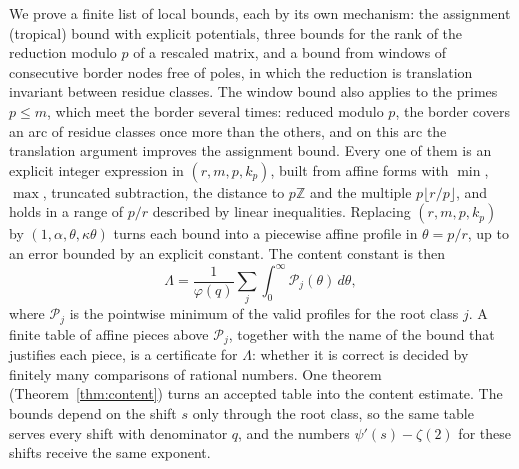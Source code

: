 \documentclass[11pt]{amsart}
\theoremstyle{definition}
\theoremstyle{remark}
\numberwithin{equation}{section}
\newcommand{\Z}{\mathbb Z}
\begin{document}
We prove a finite list of local bounds, each by its own mechanism: the assignment (tropical) bound with explicit
potentials, three bounds for the rank of the reduction modulo $p$ of a rescaled matrix, and a bound from windows of
consecutive border nodes free of poles, in which the reduction is translation invariant between residue classes. The
window bound also applies to the primes $p\le m$, which meet the border several times: reduced modulo $p$, the border
covers an arc of residue classes once more than the others, and on this arc the translation argument improves the
assignment bound.
Every one of them is an explicit integer expression in $(r,m,p,k_p)$, built from affine forms with $\min$, $\max$,
truncated subtraction, the distance to $p\Z$ and the multiple $p\lfloor r/p\rfloor$, and holds in a range of $p/r$
described by linear inequalities.
Replacing $(r,m,p,k_p)$ by $(1,\alpha,\theta,\kappa\theta)$ turns each bound into a piecewise affine profile in
$\theta=p/r$, up to an error bounded by an explicit constant. The content constant is then
\[
 \Lambda=\frac1{\varphi(q)}\sum_j\int_0^\infty\mathcal P_j(\theta)\,d\theta,
\]
where $\mathcal P_j$ is the pointwise minimum of the valid profiles for the root class $j$. A finite table of affine
pieces above $\mathcal P_j$, together with the name of the bound that justifies each piece, is a certificate for $\Lambda$:
whether it is correct is decided by finitely many comparisons of rational numbers. One theorem
(Theorem~\ref{thm:content}) turns an accepted table into the content estimate. The bounds depend on the shift $s$ only
through the root class, so the same table serves every shift with denominator $q$, and the numbers $\psi'(s)-\zeta(2)$ for
these shifts receive the same exponent.
\end{document}
